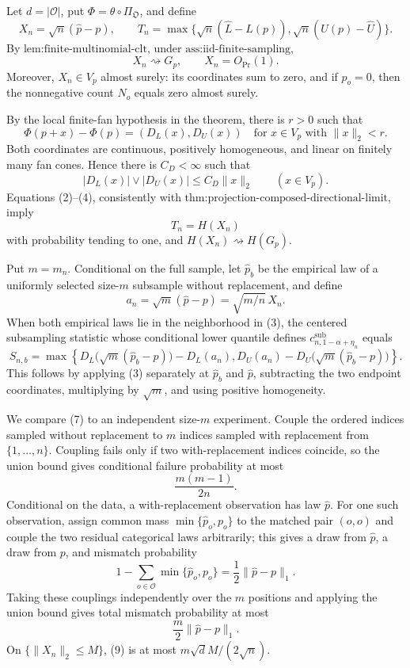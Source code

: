 Let \(d=|\mathcal O|\), put \(\Phi=\theta\circ\Pi_{\mathfrak O}\), and define
\[
X_n=\sqrt n(\widehat p-p),
\qquad
T_n=\max\{\sqrt n(\widehat L-L(p)),\sqrt n(U(p)-\widehat U)\}.
\tag{1}
\]
By \(\text{lem:finite-multinomial-clt}\), under \(\text{ass:iid-finite-sampling}\),
\[
X_n\rightsquigarrow G_p,
\qquad
X_n=O_{\Pr}(1).
\tag{2}
\]
Moreover, \(X_n\in V_p\) almost surely: its coordinates sum to zero, and if \(p_o=0\), then the nonnegative count \(N_o\) equals zero almost surely.

By the local finite-fan hypothesis in the theorem, there is \(r>0\) such that
\[
\Phi(p+x)-\Phi(p)=(D_L(x),D_U(x))
\quad\text{for }x\in V_p\text{ with }\|x\|_2<r.
\tag{3}
\]
Both coordinates are continuous, positively homogeneous, and linear on finitely many fan cones. Hence there is \(C_D<\infty\) such that
\[
|D_L(x)|\vee|D_U(x)|\leq C_D\|x\|_2
\qquad(x\in V_p).
\tag{4}
\]
Equations (2)--(4), consistently with \(\text{thm:projection-composed-directional-limit}\), imply
\[
T_n=H(X_n)
\tag{5}
\]
with probability tending to one, and \(H(X_n)\rightsquigarrow H(G_p)\).

Put \(m=m_n\). Conditional on the full sample, let \(\widehat p_b\) be the empirical law of a uniformly selected size-\(m\) subsample without replacement, and define
\[
a_n=\sqrt m(\widehat p-p)=\sqrt{m/n}\,X_n.
\tag{6}
\]
When both empirical laws lie in the neighborhood in (3), the centered subsampling statistic whose conditional lower quantile defines \(c^{\mathrm{sub}}_{n,1-\alpha+\eta_n}\) equals
\[
S_{n,b}=\max\left\{
D_L\bigl(\sqrt m(\widehat p_b-p)\bigr)-D_L(a_n),
D_U(a_n)-D_U\bigl(\sqrt m(\widehat p_b-p)\bigr)
\right\}.
\tag{7}
\]
This follows by applying (3) separately at \(\widehat p_b\) and \(\widehat p\), subtracting the two endpoint coordinates, multiplying by \(\sqrt m\), and using positive homogeneity.

We compare (7) to an independent size-\(m\) experiment. Couple the ordered indices sampled without replacement to \(m\) indices sampled with replacement from \(\{1,\ldots,n\}\). Coupling fails only if two with-replacement indices coincide, so the union bound gives conditional failure probability at most
\[
\frac{m(m-1)}{2n}.
\tag{8}
\]
Conditional on the data, a with-replacement observation has law \(\widehat p\). For one such observation, assign common mass \(\min\{\widehat p_o,p_o\}\) to the matched pair \((o,o)\) and couple the two residual categorical laws arbitrarily; this gives a draw from \(\widehat p\), a draw from \(p\), and mismatch probability
\[
1-\sum_{o\in\mathcal O}\min\{\widehat p_o,p_o\}
=\frac12\|\widehat p-p\|_1.
\]
Taking these couplings independently over the \(m\) positions and applying the union bound gives total mismatch probability at most
\[
\frac m2\|\widehat p-p\|_1.
\tag{9}
\]
On \(\{\|X_n\|_2\leq M\}\), (9) is at most \(m\sqrt d M/(2\sqrt n)\).

